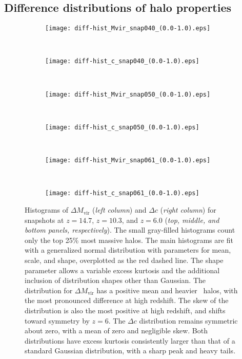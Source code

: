 \subsection{Difference distributions of halo properties}


\begin{figure*}[t]
	\centering
	\begin{subfigure}{}
		\texttt{[image: diff-hist\_Mvir\_snap040\_(0.0-1.0).eps]}
	\end{subfigure}
	~
	\begin{subfigure}{}
		\texttt{[image: diff-hist\_c\_snap040\_(0.0-1.0).eps]}
	\end{subfigure}
	\\
	\begin{subfigure}{}
		\texttt{[image: diff-hist\_Mvir\_snap050\_(0.0-1.0).eps]}
	\end{subfigure}
	~
	\begin{subfigure}{}
		\texttt{[image: diff-hist\_c\_snap050\_(0.0-1.0).eps]}
	\end{subfigure}
	\\
	\begin{subfigure}{}
		\texttt{[image: diff-hist\_Mvir\_snap061\_(0.0-1.0).eps]}
	\end{subfigure}
	~
	\begin{subfigure}{}
		\texttt{[image: diff-hist\_c\_snap061\_(0.0-1.0).eps]}
	\end{subfigure}
	\caption[Histograms of $\Delta M_{\mathrm{vir}}$ and $\Delta c$]{\footnotesize Histograms of $\Delta M_{\mathrm{vir}}$ (\textit{left column}) and $\Delta c$ (\textit{right column}) for snapshots at $z = 14.7$, $z = 10.3$, and $z = 6.0$ (\textit{top, middle, and bottom panels, respectively}).  The small gray-filled histograms count only the top 25\% most massive halos.  The main histograms are fit with a generalized normal distribution with parameters for mean, scale, and shape, overplotted as the red dashed line.  The shape parameter allows a variable excess kurtosis and the additional inclusion of distribution shapes other than Gaussian.  The distribution for $\Delta M_{\mathrm{vir}}$ has a positive mean and heavier \lpt\ halos, with the most pronounced difference at high redshift.  The skew of the distribution is also the most positive at high redshift, and shifts toward symmetry by $z = 6$.  The $\Delta c$ distribution remains symmetric about zero, with a mean of zero and negligible skew.  Both distributions have excess kurtosis consistently larger than that of a standard Gaussian distribution, with a sharp peak and heavy tails.}
	\label{fig:diff-hist_Mvir}
\end{figure*}

